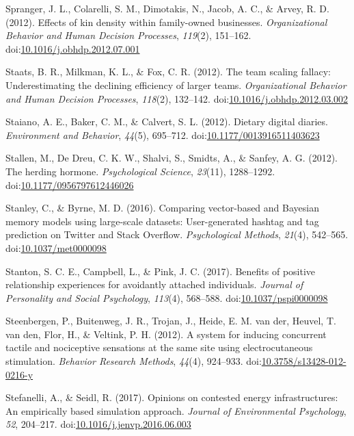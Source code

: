 \documentclass[english,man]{apa6}
\theoremstyle{definition}
\theoremstyle{definition}
\theoremstyle{definition}
\theoremstyle{remark}
\begin{document}
\hypertarget{ref-Spranger2012}{}
Spranger, J. L., Colarelli, S. M., Dimotakis, N., Jacob, A. C., \&
Arvey, R. D. (2012). Effects of kin density within family-owned
businesses. \emph{Organizational Behavior and Human Decision Processes},
\emph{119}(2), 151--162.
doi:\href{https://doi.org/10.1016/j.obhdp.2012.07.001}{10.1016/j.obhdp.2012.07.001}

\hypertarget{ref-Staats2012}{}
Staats, B. R., Milkman, K. L., \& Fox, C. R. (2012). The team scaling
fallacy: Underestimating the declining efficiency of larger teams.
\emph{Organizational Behavior and Human Decision Processes},
\emph{118}(2), 132--142.
doi:\href{https://doi.org/10.1016/j.obhdp.2012.03.002}{10.1016/j.obhdp.2012.03.002}

\hypertarget{ref-Staiano2012}{}
Staiano, A. E., Baker, C. M., \& Calvert, S. L. (2012). Dietary digital
diaries. \emph{Environment and Behavior}, \emph{44}(5), 695--712.
doi:\href{https://doi.org/10.1177/0013916511403623}{10.1177/0013916511403623}

\hypertarget{ref-Stallen2012}{}
Stallen, M., De Dreu, C. K. W., Shalvi, S., Smidts, A., \& Sanfey, A. G.
(2012). The herding hormone. \emph{Psychological Science},
\emph{23}(11), 1288--1292.
doi:\href{https://doi.org/10.1177/0956797612446026}{10.1177/0956797612446026}

\hypertarget{ref-Stanley2016}{}
Stanley, C., \& Byrne, M. D. (2016). Comparing vector-based and Bayesian
memory models using large-scale datasets: User-generated hashtag and tag
prediction on Twitter and Stack Overflow. \emph{Psychological Methods},
\emph{21}(4), 542--565.
doi:\href{https://doi.org/10.1037/met0000098}{10.1037/met0000098}

\hypertarget{ref-Stanton2017}{}
Stanton, S. C. E., Campbell, L., \& Pink, J. C. (2017). Benefits of
positive relationship experiences for avoidantly attached individuals.
\emph{Journal of Personality and Social Psychology}, \emph{113}(4),
568--588.
doi:\href{https://doi.org/10.1037/pspi0000098}{10.1037/pspi0000098}

\hypertarget{ref-Steenbergen2012}{}
Steenbergen, P., Buitenweg, J. R., Trojan, J., Heide, E. M. van der,
Heuvel, T. van den, Flor, H., \& Veltink, P. H. (2012). A system for
inducing concurrent tactile and nociceptive sensations at the same site
using electrocutaneous stimulation. \emph{Behavior Research Methods},
\emph{44}(4), 924--933.
doi:\href{https://doi.org/10.3758/s13428-012-0216-y}{10.3758/s13428-012-0216-y}

\hypertarget{ref-Stefanelli2017}{}
Stefanelli, A., \& Seidl, R. (2017). Opinions on contested energy
infrastructures: An empirically based simulation approach. \emph{Journal
of Environmental Psychology}, \emph{52}, 204--217.
doi:\href{https://doi.org/10.1016/j.jenvp.2016.06.003}{10.1016/j.jenvp.2016.06.003}
\end{document}
